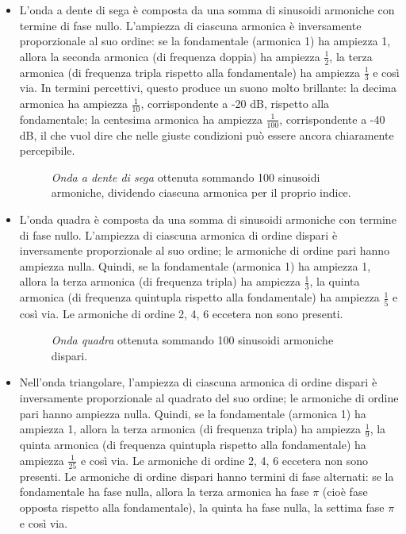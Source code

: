 \begin{itemize}

\item L'onda a dente di sega è composta da una somma di sinusoidi armoniche con termine di fase nullo. L'ampiezza di ciascuna armonica è inversamente proporzionale al suo ordine: se la fondamentale (armonica 1) ha ampiezza 1, allora la seconda armonica (di frequenza doppia) ha ampiezza $\frac{1}{2}$, la terza armonica (di frequenza tripla rispetto alla fondamentale) ha ampiezza $\frac{1}{3}$ e così via. In termini percettivi, questo produce un suono molto brillante: la decima armonica ha ampiezza $\frac{1}{10}$, corrispondente a -20 dB, rispetto alla fondamentale; la centesima armonica ha ampiezza $\frac{1}{100}$, corrispondente a -40 dB, il che vuol dire che nelle giuste condizioni può essere ancora chiaramente percepibile.

\begin{figure}
    \begin{center}
       \scalebox{0.6} {}
    \end{center}
    \caption{\emph{Onda a dente di sega} ottenuta sommando 100 sinusoidi armoniche, dividendo ciascuna armonica per il proprio indice.}
\end{figure}

\item L'onda quadra è composta da una somma di sinusoidi armoniche con termine di fase nullo. L'ampiezza di ciascuna armonica di ordine dispari è inversamente proporzionale al suo ordine; le armoniche di ordine pari hanno ampiezza nulla. Quindi, se la fondamentale (armonica 1) ha ampiezza 1, allora la terza armonica (di frequenza tripla) ha ampiezza $\frac{1}{3}$, la quinta armonica (di frequenza quintupla rispetto alla fondamentale) ha ampiezza $\frac{1}{5}$ e così via. Le armoniche di ordine 2, 4, 6 eccetera non sono presenti.

\begin{figure}
    \begin{center}
       \scalebox{0.6} {}
    \end{center}
    \caption{\emph{Onda quadra} ottenuta sommando 100 sinusoidi armoniche dispari.}
\end{figure}

\item Nell'onda triangolare, l'ampiezza di ciascuna armonica di ordine dispari è inversamente proporzionale al quadrato del suo ordine; le armoniche di ordine pari hanno ampiezza nulla. Quindi, se la fondamentale (armonica 1) ha ampiezza 1, allora la terza armonica (di frequenza tripla) ha ampiezza $\frac{1}{9}$, la quinta armonica (di frequenza quintupla rispetto alla fondamentale) ha ampiezza $\frac{1}{25}$ e così via. Le armoniche di ordine 2, 4, 6 eccetera non sono presenti. Le armoniche di ordine dispari hanno termini di fase alternati: se la fondamentale ha fase nulla, allora la terza armonica ha fase $\pi$ (cioè fase opposta rispetto alla fondamentale), la quinta ha fase nulla, la settima fase $\pi$ e così via.


\end{itemize}
